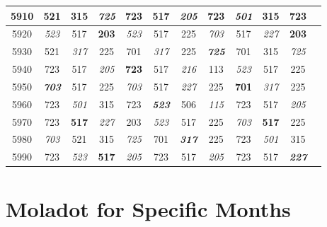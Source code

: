 \begin{Large}
\begin{tabular}{| c | c | c | c | c | c | c | c | c | c | c | c |}
		\\\hline
		5910 & 521
		& 315
		& \textit{725}
		& 723
		& 517
		& \textbf{\textit{205}}
		& 723
		& \textit{501}
		& 315
		& 723
		\\\hline
		5920 & \textit{523}
		& 517
		& \textbf{203}
		& \textit{523}
		& 517
		& 225
		& \textit{703}
		& 517
		& \textit{227}
		& \textbf{203}
		\\\hline
		5930 & 521
		& \textit{317}
		& 225
		& 701
		& \textit{317}
		& 225
		& \textbf{\textit{725}}
		& 701
		& 315
		& \textit{725}
		\\\hline
		5940 & 723
		& 517
		& \textit{205}
		& \textbf{723}
		& 517
		& \textit{216}
		& 113
		& \textit{523}
		& 517
		& 225
		\\\hline
		5950 & \textbf{\textit{703}}
		& 517
		& 225
		& \textit{703}
		& 517
		& \textit{227}
		& 225
		& \textbf{701}
		& \textit{317}
		& 225
		\\\hline
		5960 & 723
		& \textit{501}
		& 315
		& 723
		& \textbf{\textit{523}}
		& 506
		& \textit{115}
		& 723
		& 517
		& \textit{205}
		\\\hline
		5970 & 723
		& \textbf{517}
		& \textit{227}
		& 203
		& \textit{523}
		& 517
		& 225
		& \textit{703}
		& \textbf{517}
		& 225
		\\\hline
		5980 & \textit{703}
		& 521
		& 315
		& \textit{725}
		& 701
		& \textbf{\textit{317}}
		& 225
		& 723
		& \textit{501}
		& 315
		\\\hline
		5990 & 723
		& \textit{523}
		& \textbf{517}
		& \textit{205}
		& 723
		& 517
		& \textit{205}
		& 723
		& 517
		& \textbf{\textit{227}}
		\\\hline
	\end{tabular}
\end{Large}

\chapter{Moladot for Specific Months}
\label{molads}

